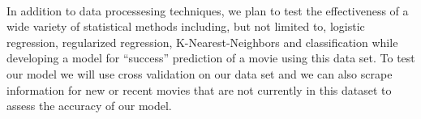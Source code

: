 \documentclass{article}
\begin{document}
\\
In addition to data processesing techniques, we plan to test the effectiveness of a wide variety of statistical methods including, but not limited to, logistic regression, regularized regression, K-Nearest-Neighbors and classification while developing a model for ``success'' prediction of a movie using this data set.  To test our model we will use cross validation on our data set and we can also scrape information for new or recent movies that are not currently in this dataset to assess the accuracy of our model.
\\
\end{document}
